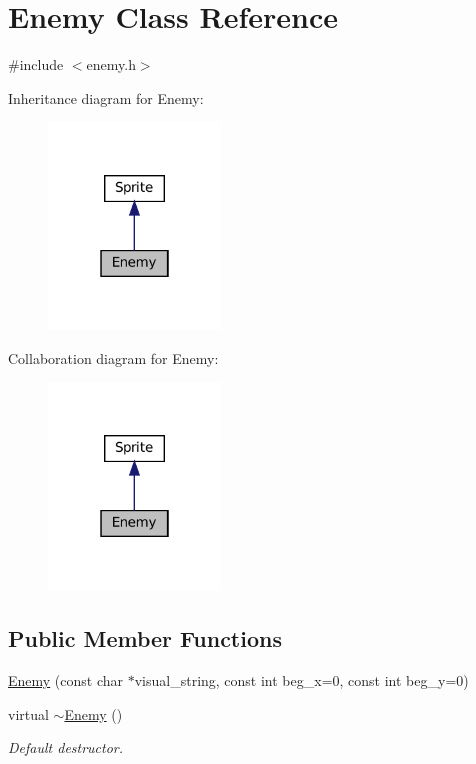 \hypertarget{classEnemy}{}\section{Enemy Class Reference}
\label{classEnemy}


{\ttfamily \#include $<$enemy.\+h$>$}



Inheritance diagram for Enemy\+:\nopagebreak
\begin{figure}[H]
\begin{center}
\leavevmode
\includegraphics[width=130pt]{classEnemy__inherit__graph}
\end{center}
\end{figure}


Collaboration diagram for Enemy\+:\nopagebreak
\begin{figure}[H]
\begin{center}
\leavevmode
\includegraphics[width=130pt]{classEnemy__coll__graph}
\end{center}
\end{figure}
\subsection*{Public Member Functions}
\begin{DoxyCompactItemize}
\item 
\hyperlink{classEnemy_a4ef7e05685524e2f717879b9428e5534}{Enemy} (const char $\ast$visual\+\_\+string, const int beg\+\_\+x=0, const int beg\+\_\+y=0)
\item 
virtual \hyperlink{classEnemy_ac0eec4755e28c02688065f9657150ac3}{$\sim$\+Enemy} ()
\begin{DoxyCompactList}\small\item\em Default destructor. \end{DoxyCompactList}\end{DoxyCompactItemize}
